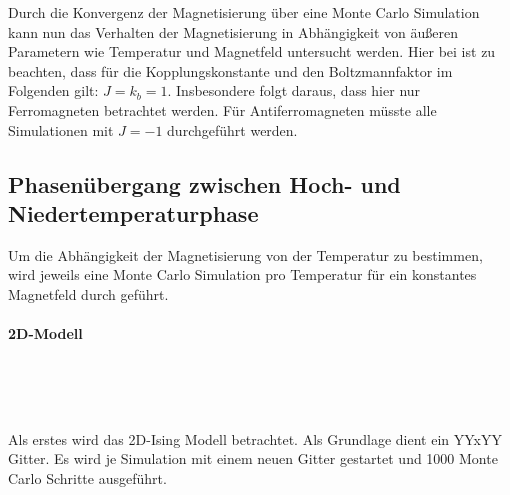 
Durch die Konvergenz der Magnetisierung über eine Monte Carlo Simulation kann nun das Verhalten der Magnetisierung in Abhängigkeit von äußeren Parametern wie Temperatur und Magnetfeld untersucht werden. Hier bei ist zu beachten, dass für die Kopplungskonstante und den Boltzmannfaktor im Folgenden gilt: $J=k_{b}=1$. Insbesondere folgt daraus, dass hier nur Ferromagneten betrachtet werden. Für Antiferromagneten müsste alle Simulationen mit $J=-1$ durchgeführt werden.


\subsection{Phasenübergang zwischen Hoch- und Niedertemperaturphase}

Um die Abhängigkeit der Magnetisierung von der Temperatur zu bestimmen, wird jeweils eine Monte Carlo Simulation pro Temperatur für ein konstantes Magnetfeld durch geführt.


\paragraph{2D-Modell}

\

\

Als erstes wird das 2D-Ising Modell betrachtet. Als Grundlage dient ein YYxYY Gitter. Es wird je Simulation mit einem neuen Gitter gestartet und 1000 Monte Carlo Schritte ausgeführt. 


